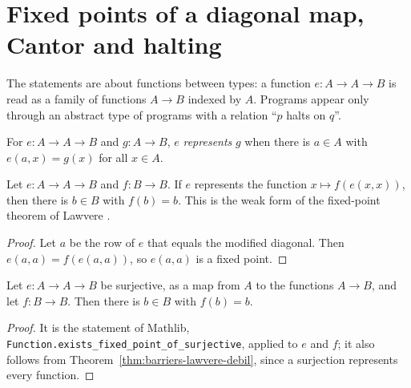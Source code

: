 \section{Fixed points of a diagonal map, Cantor and halting}
\label{sec:barriers-lawvere}

The statements are about functions between types: a function $e : A \to A \to B$ is read as a
family of functions $A \to B$ indexed by $A$. Programs appear only through an abstract type of
programs with a relation ``$p$ halts on $q$''.

\begin{definition}
  \label{def:barriers-representa}
  \leanok
  For $e : A \to A \to B$ and $g : A \to B$, $e$ \emph{represents} $g$ when there is $a \in A$ with
  $e(a, x) = g(x)$ for all $x \in A$.
  \own{}
\end{definition}

\begin{theorem}
  \label{thm:barriers-lawvere-debil}
  \leanok
  Let $e : A \to A \to B$ and $f : B \to B$. If $e$ represents the function $x \mapsto f(e(x, x))$,
  then there is $b \in B$ with $f(b) = b$. This is the weak form of the fixed-point theorem of
  Lawvere \cite{Lawvere69}.
  \own{}
\end{theorem}

\begin{proof}
  \leanok
  Let $a$ be the row of $e$ that equals the modified diagonal. Then $e(a, a) = f(e(a, a))$, so
  $e(a, a)$ is a fixed point.
\end{proof}

\begin{theorem}
  \label{thm:barriers-lawvere}
  \leanok
  Let $e : A \to A \to B$ be surjective, as a map from $A$ to the functions $A \to B$, and let
  $f : B \to B$. Then there is $b \in B$ with $f(b) = b$.
  \own{}
\end{theorem}

\begin{proof}
  \leanok
  It is the statement of Mathlib, \texttt{Function.exists\_fixed\_point\_of\_surjective}, applied
  to $e$ and $f$; it also follows from Theorem~\ref{thm:barriers-lawvere-debil}, since a
  surjection represents every function.
\end{proof}

